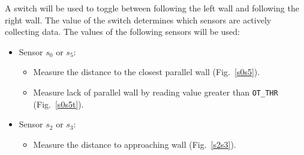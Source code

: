 A switch will be used to toggle between following the left wall and
following the right wall.  The value of the switch determines which
sensors are actively collecting data. The values of the following
sensors will be used:
\begin{itemize}
\item Sensor \(s_0\) or \(s_5\):
\begin{itemize}
\item Measure the distance to the closest parallel wall (Fig.~\ref{s0s5}).
\item Measure lack of parallel wall by reading value greater than \verb+OT_THR+ (Fig.~\ref{s0s5t}).
\end{itemize}
\item Sensor \(s_2\) or \(s_3\):
\begin{itemize}
\item Measure the distance to approaching wall (Fig.~\ref{s2s3}).
\end{itemize}
\end{itemize}

\begin{figure}[h!]
\centering
\cprotect {}
\end{figure}

